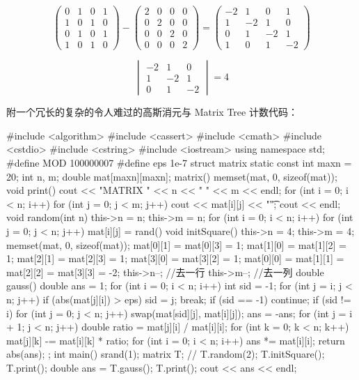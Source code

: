 $$
\begin{pmatrix}
0 & 1 & 0 & 1 \\
1 & 0 & 1 & 0 \\
0 & 1 & 0 & 1 \\
1 & 0 & 1 & 0 \end{pmatrix}-\begin{pmatrix}
2 & 0 & 0 & 0 \\
0 & 2 & 0 & 0 \\
0 & 0 & 2 & 0 \\
0 & 0 & 0 & 2 \end{pmatrix}=\begin{pmatrix}
-2 & 1 & 0 & 1 \\
1 & -2 & 1 & 0 \\
0 & 1 & -2 & 1 \\
1 & 0 & 1 & -2 \end{pmatrix}
$$

$$
\begin{vmatrix}
-2 & 1 & 0 \\
1 & -2 & 1 \\
0 & 1 & -2 \end{vmatrix} = 4
$$

附一个冗长的复杂的令人难过的高斯消元与 Matrix Tree 计数代码：

\begin{cppcode}
#include <algorithm>
#include <cassert>
#include <cmath>
#include <cstdio>
#include <cstring>
#include <iostream>
using namespace std;
#define MOD 100000007
#define eps 1e-7
struct matrix {
  static const int maxn = 20;
  int n, m;
  double mat[maxn][maxn];
  matrix() { memset(mat, 0, sizeof(mat)); }
  void print() {
    cout << "MATRIX " << n << " " << m << endl;
    for (int i = 0; i < n; i++) {
      for (int j = 0; j < m; j++) {
        cout << mat[i][j] << "\t";
      }
      cout << endl;
    }
  }
  void random(int n) {
    this->n = n;
    this->m = n;
    for (int i = 0; i < n; i++)
      for (int j = 0; j < n; j++) mat[i][j] = rand() %
  }
  void initSquare() {
    this->n = 4;
    this->m = 4;
    memset(mat, 0, sizeof(mat));
    mat[0][1] = mat[0][3] = 1;
    mat[1][0] = mat[1][2] = 1;
    mat[2][1] = mat[2][3] = 1;
    mat[3][0] = mat[3][2] = 1;
    mat[0][0] = mat[1][1] = mat[2][2] = mat[3][3] = -2;
    this->n--;  //去一行
    this->m--;  //去一列
  }
  double gauss() {
    double ans = 1;
    for (int i = 0; i < n; i++) {
      int sid = -1;
      for (int j = i; j < n; j++)
        if (abs(mat[j][i]) > eps) {
          sid = j;
          break;
        }
      if (sid == -1) continue;
      if (sid != i) {
        for (int j = 0; j < n; j++) {
          swap(mat[sid][j], mat[i][j]);
          ans = -ans;
        }
      }
      for (int j = i + 1; j < n; j++) {
        double ratio = mat[j][i] / mat[i][i];
        for (int k = 0; k < n; k++) {
          mat[j][k] -= mat[i][k] * ratio;
        }
      }
    }
    for (int i = 0; i < n; i++) ans *= mat[i][i];
    return abs(ans);
  }
};
int main() {
  srand(1);
  matrix T;
  // T.random(2);
  T.initSquare();
  T.print();
  double ans = T.gauss();
  T.print();
  cout << ans << endl;
}
\end{cppcode}
